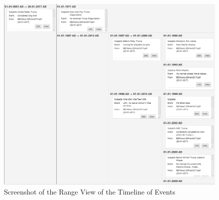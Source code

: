\begin{figure}[H]
\caption{Screenshot of the Range View of the Timeline of Events}
\label{fig:rangeView}
\includegraphics[width=\linewidth]{rangeView.png}
\centering
\end{figure}
